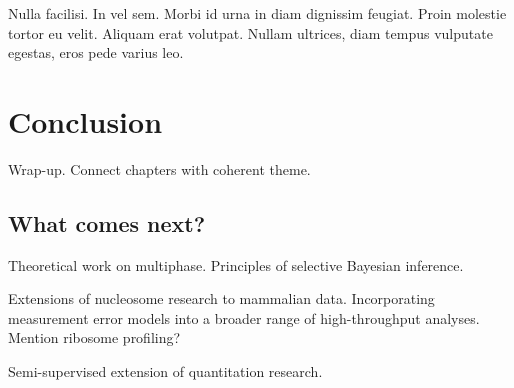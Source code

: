 
\begin{savequote}[75mm] 
Nulla facilisi. In vel sem. Morbi id urna in diam dignissim feugiat. Proin molestie tortor eu velit. Aliquam erat volutpat. Nullam ultrices, diam tempus vulputate egestas, eros pede varius leo.
\end{savequote}

\chapter{Conclusion}

Wrap-up.
Connect chapters with coherent theme.

\section{What comes next?}

Theoretical work on multiphase.
Principles of selective Bayesian inference.

Extensions of nucleosome research to mammalian data.
Incorporating measurement error models into a broader range of high-throughput analyses.
Mention ribosome profiling?

Semi-supervised extension of quantitation research.

